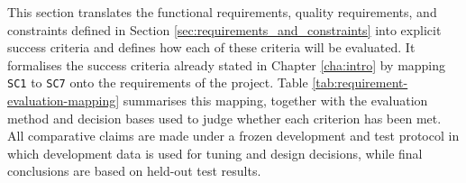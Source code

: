 This section translates the functional requirements, quality requirements, and constraints defined in Section \ref{sec:requirements_and_constraints} into explicit success criteria and defines how each of these criteria will be evaluated. It formalises the success criteria already stated in Chapter \ref{cha:intro} by mapping \texttt{SC1} to \texttt{SC7} onto the requirements of the project. Table \ref{tab:requirement-evaluation-mapping} summarises this mapping, together with the evaluation method and decision bases used to judge whether each criterion has been met. All comparative claims are made under a frozen development and test protocol in which development data is used for tuning and design decisions, while final conclusions are based on held-out test results. 

\begingroup
\footnotesize
\setlength{\tabcolsep}{4pt}
\renewcommand{\arraystretch}{1.15}


